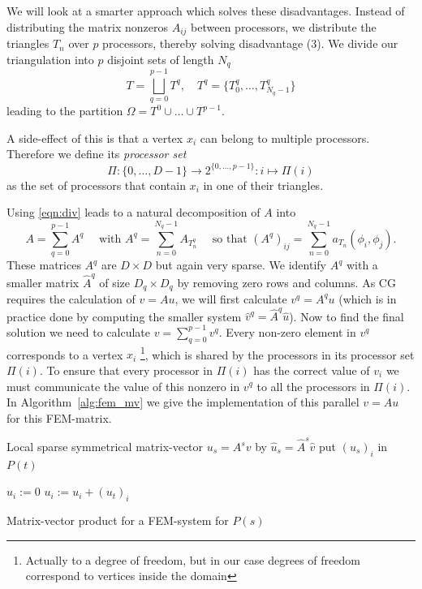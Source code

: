 \documentclass[11pt]{amsart}
\theoremstyle{definition}
\begin{document}
We will look at a smarter approach which solves these disadvantages. Instead of distributing the matrix nonzeros $A_{ij}$ between processors, we distribute the triangles $T_n$ over $p$ processors, thereby solving disadvantage (3). We divide our triangulation into $p$ disjoint sets of length $N_q$
\[
  T = \bigsqcup_{q=0}^{p-1} T^q, \quad T^q = \{ T^q_0, \ldots, T^q_{N_q-1} \}
\]
leading to the partition $\Omega = T^0 \cup \dots \cup T^{p-1}$.

A side-effect of this is that a vertex $x_i$ can belong to multiple processors. Therefore we define its \emph{processor set} 
\[
  \Pi: \{0, \ldots, D-1\} \to 2^{\{0, \ldots, p-1\}}: i \mapsto \Pi(i)
\]
as the set of processors that contain $x_i$ in one of their triangles.

Using \eqref{eqn:div} leads to a natural decomposition of $A$ into
\[
	A = \sum_{q=0}^{p-1} A^q\quad \text{ with } A^q= \sum_{n=0}^{N_q-1} A_{T^q_n} \quad \text{ so that } (A^q)_{ij} = \sum_{n=0}^{N_q-1} a_{T_n}(\phi_i,\phi_j).
\]
These matrices $A^q$ are $D \times D$ but again very sparse. We identify $A^q$ with a smaller matrix $\hat A^q$ of size $D_q \times D_q$ by removing zero rows and columns. As CG requires the calculation of $v = Au$, we will first calculate $v^q = A^q u$ (which is in practice done by computing the smaller system $\hat v^q = \hat A^q \hat u$). Now to find the final solution we need to calculate $v = \sum_{q =0}^{p-1} v^q$. 
Every non-zero element in $v^q$ corresponds to a vertex $x_i$ \footnote{Actually to a degree of freedom, but in our case degrees of freedom correspond to vertices inside the domain}, which is shared by the processors in its processor set $\Pi(i)$. To ensure that every processor in $\Pi(i)$ has the correct value of $v_i$ we must communicate the value of this nonzero in $v^q$ to all the processors in $\Pi(i)$. In Algorithm~\ref{alg:fem_mv} we give the implementation of this parallel $v = Au$ for this FEM-matrix.
\begin{algorithm}[H]
	Local sparse symmetrical matrix-vector $u_s = A^s v$ by $\hat u_s = \hat A^s \hat v$\;
	 {
		 {
			put $(u_s)_i$ in $P(t)$\;
		}
	}
  
	 {
		$u_i := 0$\;
		 {
			$u_i := u_i + (u_t)_i$\;
		}
	}
 \caption{Matrix-vector product for a FEM-system for $P(s)$}
 \label{alg:mv_fem}
\end{algorithm}
\end{document}
